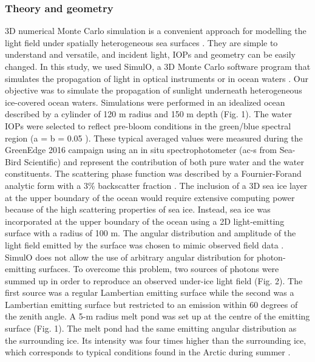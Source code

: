 \subsubsection{Theory and geometry}

3D numerical Monte Carlo simulation is a convenient approach for modelling the light field under spatially heterogeneous sea surfaces \citep{Mobley_ocean_optics_book, Petrich2012, Katlein2014, Katlein2016}. They are simple to understand and versatile, and incident light, IOPs and geometry can be easily changed. In this study, we used SimulO, a 3D Monte Carlo software program that simulates the propagation of light in optical instruments or in ocean waters \citep{Leymarie2010}. Our objective was to simulate the propagation of sunlight underneath heterogeneous ice-covered ocean waters. Simulations were performed in an idealized ocean described by a cylinder of 120 m radius and 150 m depth (Fig. 1). The water IOPs were selected to reflect pre-bloom conditions in the green/blue spectral region (a = b = 0.05 \mminus{}). These typical averaged values were measured during the GreenEdge 2016 campaign using an in situ spectrophotometer (ac-s from Sea-Bird Scientific) and represent the contribution of both pure water and the water constituents. The scattering phase function was described by a Fournier-Forand analytic form with a 3\% backscatter fraction \citep{Fournier1994, Mobley2002}. The inclusion of a 3D sea ice layer at the upper boundary of the ocean would require extensive computing power because of the high scattering properties of sea ice. Instead, sea ice was incorporated at the upper boundary of the ocean using a 2D light-emitting surface with a radius of 100 m. The angular distribution and amplitude of the light field emitted by the surface was chosen to mimic observed field data \citep{Girard2018}. SimulO does not allow the use of arbitrary angular distribution for photon-emitting surfaces. To overcome this problem, two sources of photons were summed up in order to reproduce an observed under-ice light field (Fig. 2). The first source was a regular Lambertian emitting surface while the second was a Lambertian emitting surface but restricted to an emission within 60 degrees of the zenith angle. A 5-m radius melt pond was set up at the centre of the emitting surface (Fig. 1). The melt pond had the same emitting angular distribution as the surrounding ice. Its intensity was four times higher than the surrounding ice, which corresponds to typical conditions found in the Arctic during summer \citep{Perovich2016}.

